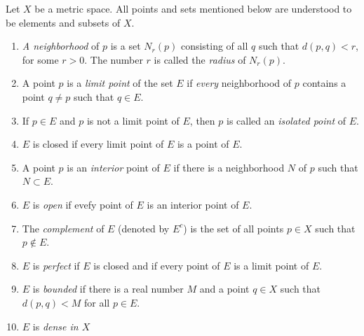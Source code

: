 \begin{definition}
    Let $X$ be a metric space. All points and sets mentioned below are understood to be elements and subsets of $X$.
\begin{enumerate}
\item[(a)] \emph{A neighborhood} of $p$ is a set $N_r(p)$ consisting of all $q$ such that $d(p,q)<r$, for some $r>0$.
The number $r$ is called the \emph{radius} of $N_r(p)$.
\item[(b)] A point $p$ is a \emph{limit point} of the set $E$ if \emph{every} neighborhood of $p$ contains a point $q \neq p$ such that $q \in E$.
\item[(c)] If $p \in E$ and $p$ is not a limit point of $E$, then $p$ is called an \emph{isolated point} of $E$.
\item[(d)] $E$ is closed if every limit point of $E$ is a point of $E$.
\item[(e)] A point $p$ is an \emph{interior} point of $E$ if there is a neighborhood $N$ of $p$ such that $N \subset E$.
\item[(f)] $E$ is \emph{open} if evefy point of $E$ is an interior point of $E$.
\item[(g)] The \emph{complement} of $E$ (denoted by $E^c$) is the set of all points $p \in X$ such that $p \notin E$.
\item[(h)] $E$ is \emph{perfect} if $E$ is closed and if every point of $E$ is a limit point of $E$.
\item[(i)] $E$ is \emph{bounded} if there is a real number $M$ and a point $q \in X$ such that $d(p,q)<M$ for all $p \in E$.    
\item[(j)] $E$ is \emph{dense in $X$} 
\end{enumerate}
\end{definition}